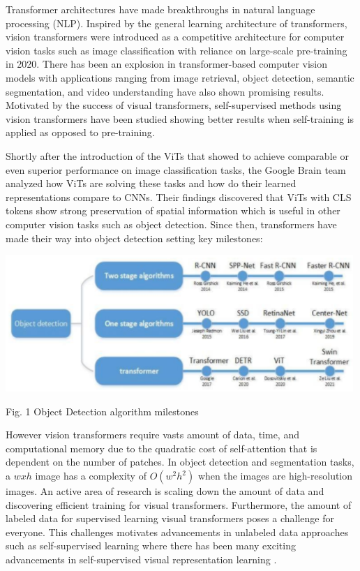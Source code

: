 \documentclass[10pt,twocolumn,letterpaper]{article}
\begin{document}
Transformer architectures\cite{vaswani2017attention} have made breakthroughs in natural language processing (NLP). Inspired by the general learning architecture of transformers, vision transformers were introduced as a competitive architecture for computer vision tasks such as image classification\cite{dosovitskiy2020image} with reliance on large-scale pre-training in 2020. There has been an explosion in transformer-based computer vision models with applications ranging from image retrieval\cite{el2021training}, object detection\cite{liu2021swin}, semantic segmentation\cite{wang2021pyramid}\cite{zhang2021multi}\cite{https://doi.org/10.48550/arxiv.2012.15840}, and video understanding\cite{https://doi.org/10.48550/arxiv.2103.15691}\cite{bertasius2021space}\cite{https://doi.org/10.48550/arxiv.2104.11227} have also shown promising results. Motivated by the success of visual transformers, self-supervised methods using vision transformers have been studied showing better results when self-training is applied as opposed to pre-training\cite{zoph2020rethinking}\cite{https://doi.org/10.48550/arxiv.2104.14294}.

Shortly after the introduction of the ViTs that showed to achieve comparable or even superior performance on image classification tasks, the Google Brain team analyzed how ViTs are solving these tasks and how do their learned representations compare to CNNs\cite{raghu2021vision}. Their findings discovered that ViTs with CLS tokens show strong preservation of spatial information which is useful in other computer vision tasks such as object detection. Since then, transformers have made their way into object detection setting key milestones\cite{arkin2021survey}:

\includegraphics[width=0.8\linewidth]{docs/latex/images/ObjectDetection.png}
\caption{Fig. 1 Object Detection algorithm milestones}


However vision transformers require vasts amount of data, time, and computational memory due to the quadratic cost of self-attention that is dependent on the number of patches. In object detection and segmentation tasks, a $wxh$ image has a complexity of $O(w^2h^2)$ when the images are high-resolution images. An active area of research is scaling down the amount of data and discovering efficient training for visual transformers\cite{liu2021efficient}\cite{lee2021vision}. Furthermore, the amount of labeled data for supervised learning visual transformers poses a challenge for everyone. This challenges motivates advancements in unlabeled data approaches such as self-supervised learning where there has been many exciting advancements in self-supervised visual representation learning  \cite{chen2020simple} \cite{he2020momentum} \cite{henaff2020dat} \cite{chen2020improved} \cite{caron2020unsupervised} \cite{grill2020bootstrap}.
\end{document}
